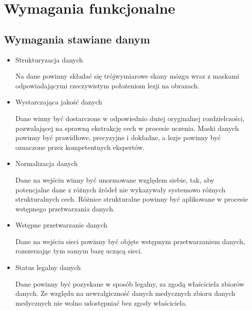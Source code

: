 \section{Wymagania funkcjonalne}
\label{sec:FunctionalRequirements}

\subsection{Wymagania stawiane danym}
\label{sec:TrainingDataRequirements}
\begin{itemize}
    \item Strukturyzacja danych
    \par
    Na dane powinny składać się trójwymiarowe skany mózgu wraz z maskami odpowiadającymi rzeczywistym położeniom lezji na obrazach.
    
    \item Wystarczająca jakość danych
    \par
    Dane winny być dostarczone w odpowiednio dużej oryginalnej rozdzielczości, pozwalającej na sprawną ekstrakcję cech w procesie uczenia. Maski danych powinny być prawidłowe, precyzyjne i dokładne, a lezje powinny być oznaczone przez kompetentnych ekspertów.
    
    \item Normalizacja danych
    \par
    Dane na wejściu winny być unormowane względem siebie, tak, aby potencjalne dane z różnych źródeł nie wykazywały systemowo różnych strukturalnych cech. Różnice strukturalne powinny być aplikowane w procesie wstępnego przetwarzania danych.
    
    \item Wstępne przetwarzanie danych
    \par 
    Dane na wejściu sieci powinny być objęte wstępnym przetwarzaniem danych, rozszerzając tym samym bazę uczącą sieci.

    \item Status legalny danych
    \par
    Dane powinny być pozyskane w sposób legalny, za zgodą właściciela zbiorów danych. Ze względu na newralgiczność danych medycznych zbioru danych medycznych nie wolno udostępniać bez zgody właściciela.
\end{itemize}

